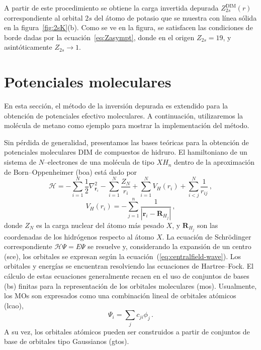 A partir de este procedimiento se obtiene la carga invertida depurada 
$Z_{2s}^{\mathrm{DIM}}(r)$ correspondiente al orbital $2s$ del átomo 
de potasio que se muestra con línea sólida en la figura~\ref{fig:2sK}(b).
Como se ve en la figura, se satisfacen las condiciones de borde dadas por
la ecuación~\ref{eq:Zasympt}, donde en el origen $Z_{2s} = 19$, y 
asintóticamente $Z_{2s} \rightarrow 1$.

\section{Potenciales moleculares}
\label{sec:potmoleculares}

En esta sección, el método de la inversión depurada es extendido para 
la obtención de potenciales efectivo moleculares. A continuación, 
utilizaremos la molécula de metano como ejemplo para mostrar la 
implementación del método.

Sin pérdida de generalidad, presentamos las bases teóricas para la 
obtención de potenciales moleculares DIM de compuestos de hidruro.
El hamiltoniano de un sistema de $N$--electrones de una molécula de 
tipo $X\!H_n$ dentro de la aproximación de Born--Oppenheimer (\acs{boa})
está dado por
\begin{equation}
 \mathcal{H}=-\sum_{i=1}^N \frac{1}{2} \nabla^2_{\mathbf{r}_i} 
 - \sum_{i=1}^N \frac{Z_N}{r_i} 
 + \sum_{i=1}^N V_H(r_i)
 + \sum_{i<j}^N \frac{1}{r_{ij}}\,,
\end{equation}
\begin{equation}
 V_H(r_i)=-\sum_{j=1}^{n} \frac{1}{\left|\mathbf{r}_i-\mathbf{R}_{H_j}\right|}\,,
\end{equation}
donde $Z_N$ es la carga nuclear del átomo más pesado $X$, y 
$\mathbf{R}_{H_j}$ son las coordenadas de los hidrógenos respecto al 
átomo $X$. La ecuación de Schr\"odinger correspondiente 
$\mathcal{H}\Psi=E\Psi$ se resuelve y, considerando la expansión de un 
centro (\acs{sce}), los orbitales se expresan según la 
ecuación~(\ref{eq:centralfield-wave}). Los orbitales y energías se 
encuentran resolviendo las ecuaciones de Hartree--Fock. El cálculo de 
estas ecuaciones generalmente recaen en el uso de conjuntos de bases 
(\acs{bs}) finitas para la representación de los orbitales moleculares 
(\acsp{mo}). Usualmente, los MOs son expresados como una combinación 
lineal de orbitales atómicos (\acs{lcao}), 
\begin{equation}
 \Psi_i=\sum_j c_{ji} \phi_j\,.
\end{equation}
A su vez, los orbitales atómicos pueden ser construidos a partir de 
conjuntos de base de orbitales tipo Gaussianos (\acsp{gto}).

